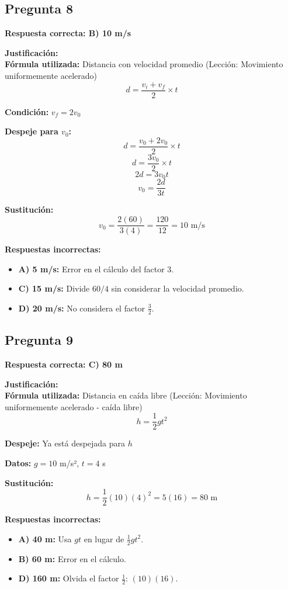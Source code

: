 \begin{respuestabox}
\subsection{Pregunta 8}
\textcolor{verdecorrecto}{\textbf{Respuesta correcta: B) 10 m/s}}

\textbf{Justificación:}\\
\textbf{Fórmula utilizada:} Distancia con velocidad promedio (Lección: Movimiento uniformemente acelerado)
$$d = \frac{v_i + v_f}{2} \times t$$

\textbf{Condición:} $v_f = 2v_0$

\textbf{Despeje para $v_0$:}
$$d = \frac{v_0 + 2v_0}{2} \times t$$
$$d = \frac{3v_0}{2} \times t$$
$$2d = 3v_0 t$$
$$v_0 = \frac{2d}{3t}$$

\textbf{Sustitución:}
$$v_0 = \frac{2(60)}{3(4)} = \frac{120}{12} = 10 \text{ m/s}$$

\textbf{Respuestas incorrectas:}
\begin{itemize}
    \item \textbf{A) 5 m/s:} Error en el cálculo del factor 3.
    \item \textbf{C) 15 m/s:} Divide $60/4$ sin considerar la velocidad promedio.
    \item \textbf{D) 20 m/s:} No considera el factor $\frac{3}{2}$.
\end{itemize}
\end{respuestabox}

\begin{respuestabox}
\subsection{Pregunta 9}
\textcolor{verdecorrecto}{\textbf{Respuesta correcta: C) 80 m}}

\textbf{Justificación:}\\
\textbf{Fórmula utilizada:} Distancia en caída libre (Lección: Movimiento uniformemente acelerado - caída libre)
$$h = \frac{1}{2}gt^2$$

\textbf{Despeje:} Ya está despejada para $h$

\textbf{Datos:} $g = 10$ m/s², $t = 4$ s

\textbf{Sustitución:}
$$h = \frac{1}{2}(10)(4)^2 = 5(16) = 80 \text{ m}$$

\textbf{Respuestas incorrectas:}
\begin{itemize}
    \item \textbf{A) 40 m:} Usa $gt$ en lugar de $\frac{1}{2}gt^2$.
    \item \textbf{B) 60 m:} Error en el cálculo.
    \item \textbf{D) 160 m:} Olvida el factor $\frac{1}{2}$: $(10)(16)$.
\end{itemize}
\end{respuestabox}

